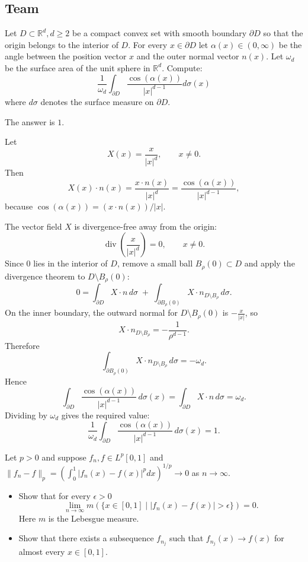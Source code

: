 \subsection*{Team}

\begin{exercise}
\label{analysis:2016:7}
Let $D \subset \mathbb{R}^d, d \geq 2$ be a compact convex set with smooth boundary $\partial D$ so that the origin belongs to the interior of $D$. For every $x \in \partial D$ let $\alpha(x) \in (0, \infty)$ be the angle between the position vector $x$ and the outer normal vector $n(x)$. Let $\omega_d$ be the surface area of the unit sphere in $\mathbb{R}^d$. Compute:
\[
\frac{1}{\omega_d} \int_{\partial D} \frac{\cos(\alpha(x))}{|x|^{d-1}} d\sigma(x)
\]
where $d\sigma$ denotes the surface measure on $\partial D$.
\end{exercise}

\begin{solution}
The answer is $1$.

Let
\[
X(x)=\frac{x}{|x|^d},\qquad x\neq 0.
\]
Then
\[
X(x)\cdot n(x)=\frac{x\cdot n(x)}{|x|^d}
=\frac{\cos(\alpha(x))}{|x|^{d-1}},
\]
because $\cos(\alpha(x))=(x\cdot n(x))/|x|$.

The vector field $X$ is divergence-free away from the origin:
\[
\operatorname{div}\left(\frac{x}{|x|^d}\right)=0,\qquad x\neq 0.
\]
Since $0$ lies in the interior of $D$, remove a small ball $B_\rho(0)\subset D$ and apply the divergence theorem to $D\setminus B_\rho(0)$:
\[
0=\int_{\partial D} X\cdot n\,d\sigma
\;+\;\int_{\partial B_\rho(0)}X\cdot n_{D\setminus B_\rho}\,d\sigma .
\]
On the inner boundary, the outward normal for $D\setminus B_\rho(0)$ is $-\frac{x}{|x|}$, so
\[
X\cdot n_{D\setminus B_\rho}
=-\frac{1}{\rho^{d-1}}.
\]
Therefore
\[
\int_{\partial B_\rho(0)}X\cdot n_{D\setminus B_\rho}\,d\sigma
=-\omega_d.
\]
Hence
\[
\int_{\partial D}\frac{\cos(\alpha(x))}{|x|^{d-1}}\,d\sigma(x)
=\int_{\partial D}X\cdot n\,d\sigma
=\omega_d.
\]
Dividing by $\omega_d$ gives the required value:
\[
\frac{1}{\omega_d}\int_{\partial D}
\frac{\cos(\alpha(x))}{|x|^{d-1}}\,d\sigma(x)=1.
\]
\end{solution}

\begin{exercise}
\label{analysis:2016:8}
Let $p > 0$ and suppose $f_n, f \in L^p[0,1]$ and $\|f_n - f\|_p = (\int_0^1 |f_n(x) - f(x)|^p dx)^{1/p} \to 0$ as $n \to \infty$.
\begin{itemize}
    \item[a)] Show that for every $\epsilon > 0$
    \[
    \lim_{n \to \infty} m(\{x \in [0, 1] \mid |f_n(x) - f(x)| > \epsilon\}) = 0.
    \]
    Here $m$ is the Lebesgue measure.
    \item[b)] Show that there exists a subsequence $f_{n_j}$ such that $f_{n_j}(x) \to f(x)$ for almost every $x \in [0, 1]$.
\end{itemize}
\end{exercise}

